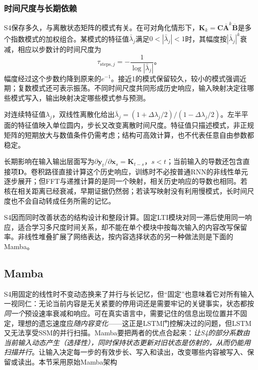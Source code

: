 \subsubsection{时间尺度与长期依赖}
\label{sec:rnn-s4-long-memory}

S4保存多久，与离散状态矩阵的模式有关。在可对角化情形下，$\bm K_k=\bm C\overline{\bm A}^k\overline{\bm B}$是多个指数模式的加权组合。某模式的特征值$\bar\lambda_j$满足$0<|\bar\lambda_j|<1$时，其幅度按$|\bar\lambda_j|^k$衰减，相应以步数计的时间尺度为
\begin{equation}
  \tau_{\mathrm{steps},j}=-\frac{1}{\log|\bar\lambda_j|}\text{。}
  \label{eq:rnn-s4-timescale}
\end{equation}
幅度经过这个步数约降到原来的$e^{-1}$。接近1的模式保留较久，较小的模式强调近期；复数模式还可表示振荡。不同时间尺度共同形成历史响应，输入映射决定往哪些模式写入，输出映射决定哪些模式参与预测。

对连续特征值$\lambda_j$，双线性离散化给出$\bar\lambda_j=(1+\Delta\lambda_j/2)/(1-\Delta\lambda_j/2)$。左半平面的特征值映入单位圆内，步长又改变离散时间尺度。特征值只描述模式，非正规矩阵的短期放大与数值条件仍需考虑；结构可高效计算，也不代表任意自由参数都稳定。

长期影响在输入输出层面写为$\partial\bm y_t/\partial\bm x_s=\bm K_{t-s}$，$s<t$；当前输入的导数还包含直接项$\bm D$。卷积路径直接计算这个历史响应，训练时不必按普通RNN的非线性单元逐步展开；但FFT与递推计算的是同一个映射，相关历史响应的导数也相同。若核在相关距离已经衰减，早期证据仍然弱；若读写映射没有利用慢模式，长时间尺度也不会自动转成任务所需的记忆。

S4因而同时改善状态的结构设计和整段计算。固定LTI模块对同一滞后使用同一响应，适合学习多尺度时间关系，却不能在单个模块中按每次输入的内容改写保留率。非线性堆叠扩展了网络表达，按内容选择状态的另一种做法则是下面的Mamba。

\subsection{Mamba}
\label{sec:rnn-mamba}

S4用固定的线性时不变动态换来了并行与长记忆，但“固定”也意味着它对所有输入一视同仁：无论当前内容是无关紧要的停用词还是需要牢记的关键事实，状态都按\emph{同一个}预设速率衰减和响应。可在真实语言中，需要记住的信息出现位置并不固定，理想的遗忘速度应\emph{随内容变化}——这正是LSTM门控解决过的问题，但LSTM又无法享受SSM的并行扫描。Mamba要把两者的优点合起来：\emph{让S4的部分系数由当前输入动态产生（选择性），同时保持状态更新对旧状态是仿射的，从而仍能用扫描并行}。让输入决定每一步的有效步长、写入和读出，改变哪些内容被写入、保留或读出。本节采用原始Mamba架构

